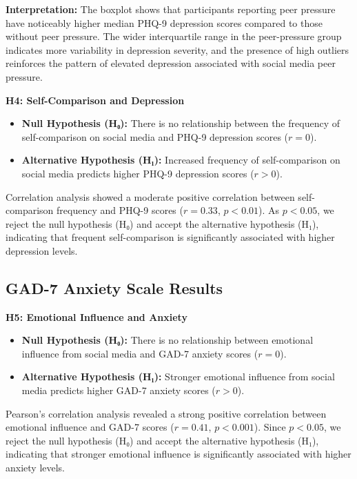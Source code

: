 \documentclass[twocolumn,numbers]{article}
\begin{document}
\textbf{Interpretation:} The boxplot shows that participants reporting peer pressure have noticeably higher median PHQ-9 depression scores compared to those without peer pressure. The wider interquartile range in the peer-pressure group indicates more variability in depression severity, and the presence of high outliers reinforces the pattern of elevated depression associated with social media peer pressure.

\textbf{H4: Self-Comparison and Depression}

\begin{itemize}
    \item \textbf{Null Hypothesis (H₀):} There is no relationship between the frequency of self-comparison on social media and PHQ-9 depression scores ($r = 0$).
    \item \textbf{Alternative Hypothesis (H₁):} Increased frequency of self-comparison on social media predicts higher PHQ-9 depression scores ($r > 0$).
\end{itemize}

Correlation analysis showed a moderate positive correlation between self-comparison frequency and PHQ-9 scores ($r = 0.33$, $p < 0.01$). As $p < 0.05$, we reject the null hypothesis (H₀) and accept the alternative hypothesis (H₁), indicating that frequent self-comparison is significantly associated with higher depression levels.

\subsection{GAD-7 Anxiety Scale Results}

\textbf{H5: Emotional Influence and Anxiety}

\begin{itemize}
    \item \textbf{Null Hypothesis (H₀):} There is no relationship between emotional influence from social media and GAD-7 anxiety scores ($r = 0$).
    \item \textbf{Alternative Hypothesis (H₁):} Stronger emotional influence from social media predicts higher GAD-7 anxiety scores ($r > 0$).
\end{itemize}

Pearson’s correlation analysis revealed a strong positive correlation between emotional influence and GAD-7 scores ($r = 0.41$, $p < 0.001$). Since $p < 0.05$, we reject the null hypothesis (H₀) and accept the alternative hypothesis (H₁), indicating that stronger emotional influence is significantly associated with higher anxiety levels.
\end{document}
